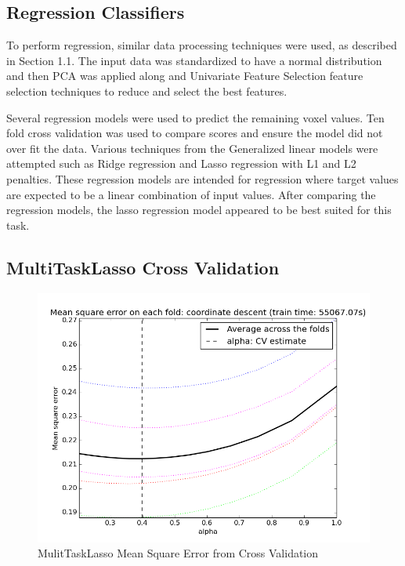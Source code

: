 \documentclass{article} %
\begin{document}
\subsection{Regression Classifiers}

To perform regression, similar data processing techniques were used, as described in Section 1.1. The input data was standardized to have a normal distribution and then PCA was applied along and Univariate Feature Selection feature selection techniques to reduce and select the best features. 

Several regression models were used to predict the remaining voxel values. Ten fold cross validation was used to compare scores and ensure the model did not over fit the data. Various techniques from the Generalized linear models were attempted such as Ridge regression and Lasso regression with L1 and L2 penalties. These regression models are intended for regression where target values are expected to be a linear combination of input values. After comparing the regression models, the lasso regression model appeared to be best suited for this task.

\subsection{MultiTaskLasso Cross Validation}

\begin{figure}
	\vspace{-20pt}
	\begin{center}
		\includegraphics[scale=.35]{media/cross_validation_figure_2.png}
	\end{center}
	\caption{MulitTaskLasso Mean Square Error from Cross Validation}
	\vspace{-20pt}
\end{figure}
\end{document}
